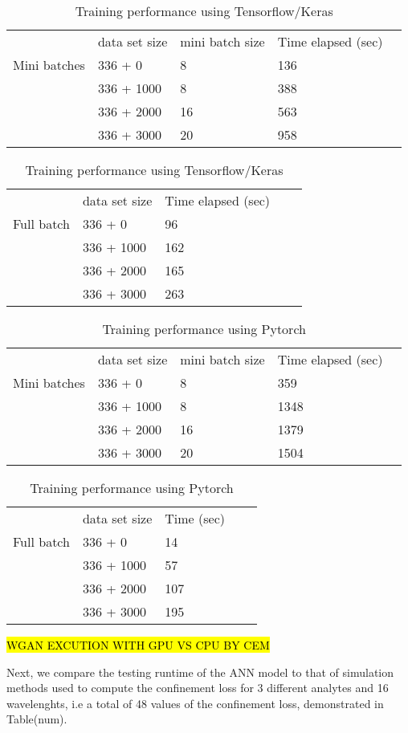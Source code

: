 \documentclass[draft, a4, 10pt, onecolumn]{IEEEtran}
\begin{document}
\begin{table}[h]
\begin{tabular}{lllll}
    & data set size & mini batch size & Time elapsed (sec) \\
Mini batches    &336 + 0 & 8 & 136 & \\
    &336 + 1000 & 8 & 388 & \\
    &336 + 2000 & 16 & 563  & \\ 
    &336 + 3000 & 20 & 958  & \\
\end{tabular}
\begin{tabular}{lllll}
   & data set size & Time elapsed (sec) \\
Full batch    &336 + 0 &  96 & \\
    &336 + 1000 &  162 & \\
    &336 + 2000 &  165 & \\ 
    &336 + 3000 &  263 & \\
\end{tabular}
\caption{Training performance using Tensorflow/Keras}
\end{table}
\begin{table}[h]
\begin{tabular}{lllll}
 & data set size & mini batch size & Time elapsed (sec) \\
Mini batches    & 336 + 0 & 8 & 359 & \\
    & 336 + 1000 & 8 & 1348  & \\
    & 336 + 2000 & 16 & 1379  & \\ 
    & 336 + 3000 & 20 & 1504 & \\
\end{tabular}
\begin{tabular}{lllll}
   &data set size & Time (sec) \\
   Full batch &336 + 0 &  14  & \\
    & 336 + 1000 &  57  & \\
    & 336 + 2000 &  107  & \\ 
    & 336 + 3000 &  195  & \\
\end{tabular}
\caption{Training performance using Pytorch}
\end{table}

\hl{WGAN EXCUTION WITH GPU VS CPU BY CEM}

Next, we compare the testing runtime of the ANN model to that of simulation methods used to compute the confinement loss for 3 different analytes and 16 wavelenghts, i.e a total of 48 values of the confinement loss, demonstrated in Table(num).
\end{document}
